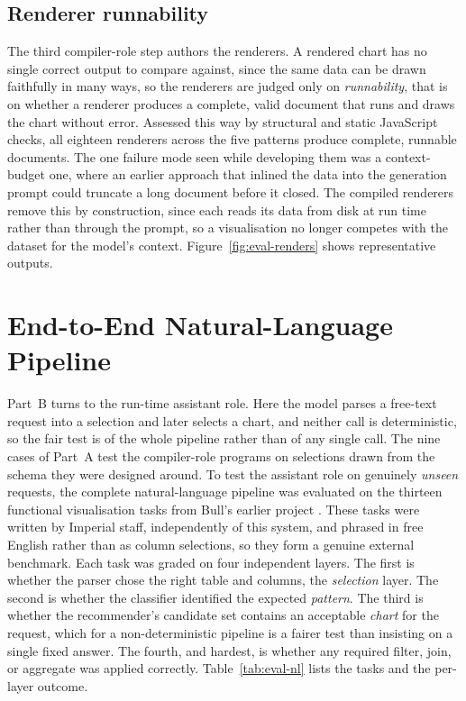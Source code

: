 \subsection{Renderer runnability}
\label{sec:eval-step3}

The third compiler-role step authors the renderers. A rendered chart has no single correct output to compare against, since the same data can be drawn faithfully in many ways, so the renderers are judged only on \emph{runnability}, that is on whether a renderer produces a complete, valid document that runs and draws the chart without error. Assessed this way by structural and static JavaScript checks, all eighteen renderers across the five patterns produce complete, runnable documents. The one failure mode seen while developing them was a context-budget one, where an earlier approach that inlined the data into the generation prompt could truncate a long document before it closed. The compiled renderers remove this by construction, since each reads its data from disk at run time rather than through the prompt, so a visualisation no longer competes with the dataset for the model's context. Figure~\ref{fig:eval-renders} shows representative outputs.


\section{End-to-End Natural-Language Pipeline}
\label{sec:eval-nl}

Part~B turns to the run-time assistant role. Here the model parses a free-text request into a selection and later selects a chart, and neither call is deterministic, so the fair test is of the whole pipeline rather than of any single call. The nine cases of Part~A test the compiler-role programs on selections drawn from the schema they were designed around. To test the assistant role on genuinely \emph{unseen} requests, the complete natural-language pipeline was evaluated on the thirteen functional visualisation tasks from Bull's earlier project \cite{bull2023visualisation}. These tasks were written by Imperial staff, independently of this system, and phrased in free English rather than as column selections, so they form a genuine external benchmark. Each task was graded on four independent layers. The first is whether the parser chose the right table and columns, the \emph{selection} layer. The second is whether the classifier identified the expected \emph{pattern}. The third is whether the recommender's candidate set contains an acceptable \emph{chart} for the request, which for a non-deterministic pipeline is a fairer test than insisting on a single fixed answer. The fourth, and hardest, is whether any required filter, join, or aggregate was applied correctly. Table~\ref{tab:eval-nl} lists the tasks and the per-layer outcome.

